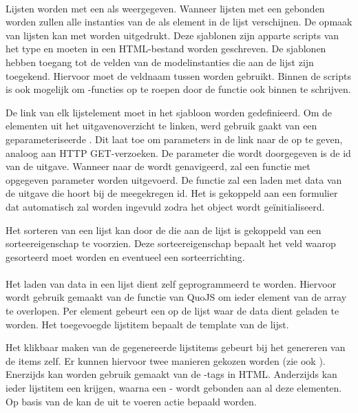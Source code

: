 \paragraph{\kendo}
Lijsten worden met een  als  weergegeven.
Wanneer lijsten met een  gebonden worden zullen alle instanties van de  als element in de lijst verschijnen.
De opmaak van lijsten kan met \kendo{}  worden uitgedrukt.
Deze sjablonen zijn apparte scripts van het type  en moeten in een HTML-bestand worden geschreven.
De sjablonen hebben toegang tot de velden van de modelinstanties die aan de lijst zijn toegekend.
Hiervoor moet de veldnaam tussen  worden gebruikt.
Binnen de scripts is ook mogelijk om \js-functies op te roepen door de functie ook binnen  te schrijven.

De link van elk lijstelement moet in het sjabloon worden gedefinieerd.
Om de elementen uit het uitgavenoverzicht te linken, werd gebruik gaakt van een geparameteriseerde .
Dit laat toe om parameters in de link naar de  op te geven,  analoog aan HTTP GET-verzoeken.
De parameter die wordt doorgegeven is de id van de uitgave.
Wanneer naar de  wordt genavigeerd, zal een functie met opgegeven parameter worden uitgevoerd.
De functie zal een  laden met data van de uitgave die hoort bij de meegekregen id.
Het  is gekoppeld aan een formulier dat automatisch zal worden ingevuld zodra het object wordt geïnitialiseerd.

Het sorteren van een lijst kan door de  die aan de lijst is gekoppeld van een sorteereigenschap te voorzien.
Deze sorteereigenschap bepaalt het veld waarop gesorteerd moet worden en eventueel een sorteerrichting.

\paragraph{\lungo}
Het laden van data in een lijst dient zelf geprogrammeerd te worden.
Hiervoor wordt gebruik gemaakt van de functie  van QuoJS om ieder element van de array te overlopen.
Per element gebeurt een  op de lijst waar de data dient geladen te worden.
Het toegevoegde lijstitem bepaalt de template van de lijst.

Het klikbaar maken van de gegenereerde lijstitems gebeurt bij het genereren van de items zelf.
Er kunnen hiervoor twee manieren gekozen worden (zie ook \jqm{}).
Enerzijds kan worden gebruik gemaakt van de -tags in HTML.
Anderzijds kan ieder lijstitem een  krijgen, waarna een -  wordt gebonden aan al deze elementen.
Op basis van de  kan de uit te voeren actie bepaald worden.

